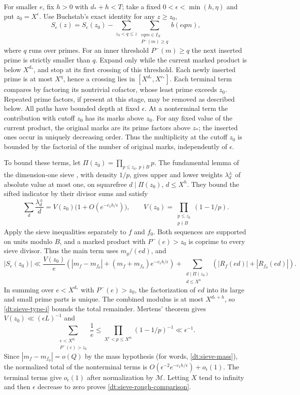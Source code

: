 \documentclass[11pt,a4paper]{article}
\theoremstyle{paperplain}
\numberwithin{equation}{section}
\begin{document}
For smaller \(e\), fix \(h>0\) with \(d_*+h<T\); take a
fixed \(0<\epsilon<\min(h,\eta)\) and put \(z_0=X^\epsilon\).
Use Buchstab's exact identity for any \(z\ge z_0\),
\begin{equation}
 S_e(z)=S_e(z_0)-
    \sum_{z_0<q\le z}
      \sum_{\substack{eqm\in I_X\\P^-(m)\ge q}} b(eqm),
 \label{dt:sieve-buchstab-exact}
\end{equation}
where \(q\) runs over primes. For an inner threshold \(P^-(m)\ge q\)
the next inserted prime is strictly smaller than \(q\).
Expand only while the current marked product is below
\(X^{d_*}\), and stop at its first crossing of this threshold.
Each newly inserted prime is at most \(X^\eta\), hence a
crossing lies in \([X^{d_*},X^{c_*}]\). Each terminal term
compares by factoring its nontrivial cofactor, whose least
prime exceeds \(z_0\). Repeated prime factors, if present at
this stage, may be removed as described below. All paths have
bounded depth at fixed \(\epsilon\). At a nonterminal term
the contribution with cutoff \(z_0\) has its marks above
\(z_0\). For any fixed value of the current product, the
original marks are its prime factors above \(z_*\); the
inserted ones occur in uniquely decreasing order. Thus
the multiplicity at the cutoff \(z_0\) is bounded by the
factorial of the number of original marks, independently of
\(\epsilon\).

To bound these terms, let
\(\Pi(z_0)=\prod_{p\le z_0,\ p\nmid B}p\).
The fundamental lemma of the dimension-one sieve
\cite{Harman2007}, with density \(1/p\), gives upper and lower
weights \(\lambda_d^\pm\) of absolute value at most one, on
squarefree \(d\mid\Pi(z_0)\), \(d\le X^h\). They bound the
sifted indicator by their divisor sums and satisfy
\[
 \sum_d\frac{\lambda_d^\pm}{d}
    =V(z_0)\bigl(1+O(e^{-c_1h/\epsilon})\bigr),\qquad
 V(z_0)=\prod_{\substack{p\le z_0\\p\nmid B}}(1-1/p).
\]
Apply the sieve inequalities separately to \(f\) and \(f_0\).
Both sequences are supported on units modulo $B$, and a
marked product with \(P^-(e)>z_0\) is coprime to every sieve
divisor. Thus the main term uses \(m_g/(ed)\), and
\[
 |S_e(z_0)|\ll \frac{V(z_0)}{e}
      \left(|m_f-m_{f_0}|+(m_f+m_{f_0})e^{-c_1h/\epsilon}\right)
     +\sum_{\substack{d\mid \Pi(z_0)\\d\le X^h}}
         (|R_f(ed)|+|R_{f_0}(ed)|).
\]
In summing over \(e<X^{d_*}\) with \(P^-(e)>z_0\), the
factorization of \(ed\) into its large and small prime parts
is unique. The combined modulus is at most \(X^{d_*+h}\),
so \eqref{dt:sieve-type-i} bounds the total remainder.
Mertens' theorem gives \(V(z_0)\ll(\epsilon L)^{-1}\) and
\[
 \sum_{\substack{e<X^{d_*}\\P^-(e)>z_0}}\frac1e
   \le\prod_{X^\epsilon<p\le X^{d_*}}(1-1/p)^{-1}
   \ll\epsilon^{-1}.
\]
Since $|m_f-m_{f_0}|=o(Q)$ by the mass hypothesis (for words, \eqref{dt:sieve-mass}), the normalized total of the
nonterminal terms is
\(O(\epsilon^{-2}e^{-c_1h/\epsilon})+o_\epsilon(1)\).
The terminal terms give \(o_\epsilon(1)\) after
normalization by \(\mathcal M\). Letting \(X\) tend to
infinity and then \(\epsilon\) decrease to zero proves
\eqref{dt:sieve-rough-comparison}.
\end{document}
